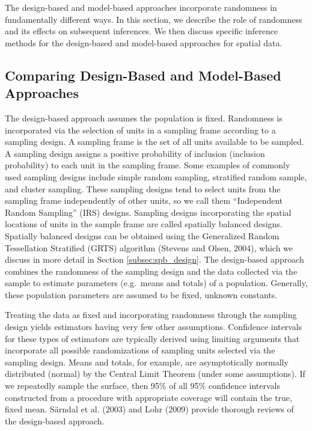 \documentclass[]{elsarticle} %
\begin{document}
The design-based and model-based approaches incorporate randomness in
fundamentally different ways. In this section, we describe the role of
randomness and its effects on subsequent inferences. We then discuss
specific inference methods for the design-based and model-based
approaches for spatial data.

\hypertarget{subsec:dvm_compare}{%
\subsection{Comparing Design-Based and Model-Based
Approaches}\label{subsec:dvm_compare}}

The design-based approach assumes the population is fixed. Randomness is
incorporated via the selection of units in a sampling frame according to
a sampling design. A sampling frame is the set of all units available to
be sampled. A sampling design assigns a positive probability of
inclusion (inclusion probability) to each unit in the sampling frame.
Some examples of commonly used sampling designs include simple random
sampling, stratified random sample, and cluster sampling. These sampling
designs tend to select units from the sampling frame independently of
other units, so we call them ``Independent Random Sampling'' (IRS)
designs. Sampling designs incorporating the spatial locations of units
in the sample frame are called spatially balanced designs. Spatially
balanced designs can be obtained using the Generalized Random
Tessellation Stratified (GRTS) algorithm (Stevens and Olsen, 2004),
which we discuss in more detail in Section \ref{subsec:spb_design}. The
design-based approach combines the randomness of the sampling design and
the data collected via the sample to estimate parameters (e.g.~means and
totals) of a population. Generally, these population parameters are
assumed to be fixed, unknown constants.

Treating the data as fixed and incorporating randomness through the
sampling design yields estimators having very few other assumptions.
Confidence intervals for these types of estimators are typically derived
using limiting arguments that incorporate all possible randomizations of
sampling units selected via the sampling design. Means and totals, for
example, are asymptotically normally distributed (normal) by the Central
Limit Theorem (under some assumptions). If we repeatedly sample the
surface, then 95\% of all 95\% confidence intervals constructed from a
procedure with appropriate coverage will contain the true, fixed mean.
Särndal et al. (2003) and Lohr (2009) provide thorough reviews of the
design-based approach.
\end{document}
